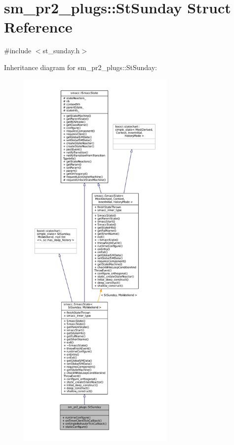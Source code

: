 \hypertarget{structsm__pr2__plugs_1_1StSunday}{}\section{sm\+\_\+pr2\+\_\+plugs\+:\+:St\+Sunday Struct Reference}
\label{structsm__pr2__plugs_1_1StSunday}


{\ttfamily \#include $<$st\+\_\+sunday.\+h$>$}



Inheritance diagram for sm\+\_\+pr2\+\_\+plugs\+:\+:St\+Sunday\+:
\nopagebreak
\begin{figure}[H]
\begin{center}
\leavevmode
\includegraphics[height=550pt]{structsm__pr2__plugs_1_1StSunday__inherit__graph}
\end{center}
\end{figure}


